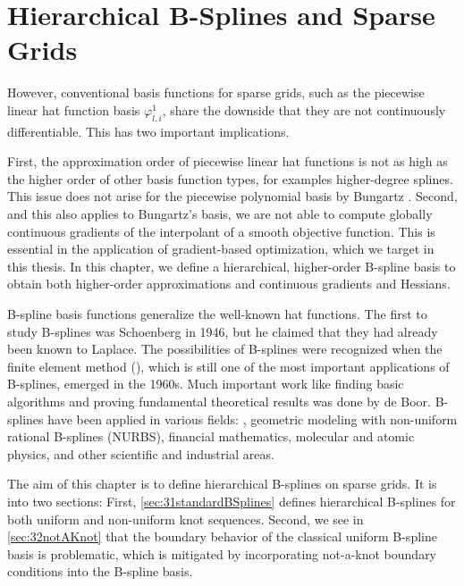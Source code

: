 
\chapter{Hierarchical B-Splines and Sparse Grids}
\label{chap:30BSplines}




However, conventional basis functions for sparse grids,
such as the piecewise linear hat function basis $\varphi_{l,i}^1$,
share the downside that they are not continuously differentiable.
This has two important implications.

First, the approximation order of piecewise linear hat functions
is not as high as the higher order of other basis function types,
for examples higher-degree splines.
This issue does not arise for the piecewise polynomial basis
by Bungartz \cite{Bungartz98Finite}.
Second, and this also applies to Bungartz's basis,
we are not able to compute globally continuous gradients of the
interpolant of a smooth objective function.
This is essential in the application of gradient-based optimization,
which we target in this thesis.
In this chapter, we define a hierarchical, higher-order B-spline basis
to obtain both higher-order approximations
and continuous gradients and Hessians.

B-spline basis functions generalize the well-known hat functions.
The first to study B-splines was Schoenberg in 1946,
but he claimed that they had already been known to Laplace.
%
The possibilities of B-splines were recognized when
the finite element method (\fem),
which is still one of the most important applications of B-splines,
emerged in the 1960s.
Much important work like finding basic algorithms and proving fundamental
theoretical results was done by de Boor.
B-splines have been applied in various fields:
\fem,
geometric modeling with non-uniform rational B-splines (NURBS),
financial mathematics,
molecular and atomic physics,
and other scientific and industrial areas.

The aim of this chapter is to define hierarchical B-splines on sparse grids.
It is into two sections:
First, \cref{sec:31standardBSplines} defines hierarchical B-splines for both
uniform and non-uniform knot sequences.
Second, we see in \cref{sec:32notAKnot} that the boundary behavior
of the classical uniform B-spline basis is problematic,
which is mitigated by incorporating not-a-knot boundary conditions
into the B-spline basis.





